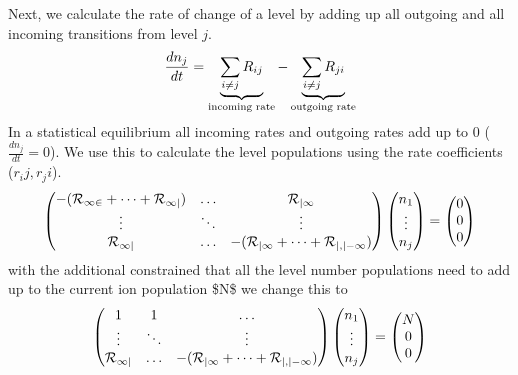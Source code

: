 \documentclass[letterpaper,10pt,english]{sphinxmanual}
\begin{document}
Next, we calculate the rate of change of a level by adding up all outgoing and all incoming transitions from level $j$.
\begin{gather}
\begin{split}\frac{dn_j}{dt} = \underbrace{\sum_{i \ne j} R_{ij}}_\textrm{incoming rate} -
                    \underbrace{\sum_{i \ne j} R_{ji}}_\textrm{outgoing rate}\end{split}\notag
\end{gather}
In a statistical equilibrium all incoming rates and outgoing rates add up to 0 ($\frac{dn_j}{dt}=0$). We use this to
calculate the level populations using the rate coefficients ($r_ij, r_ji$).
\begin{gather}
\begin{split}\left(
\begin{matrix}
-(\cal{R}_{12} + \dots + \cal{R}_{1j}) & \dots & \cal{R}_{j1}\\
\vdots & \ddots & \vdots \\
\cal{R}_{1j} & \dots & - (\cal{R} _{j1} + \dots + \cal{R} _{j, j-1}) \\
\end{matrix}
\right)
%
\left(
\begin{matrix}
n_1\\
\vdots\\
n_j\\
\end{matrix}
\right)
%
=
%
\left(
\begin{matrix}
0\\
0\\
0\\
\end{matrix}
\right)\end{split}\notag
\end{gather}
with the additional constrained that all the level number populations need to add up to the current ion population \$N\$ we change this to
\begin{gather}
\begin{split}\left(
\begin{matrix}
1 & 1 & \dots \\
\vdots & \ddots & \vdots \\
\cal{R}_{1j} & \dots & - (\cal{R} _{j1} + \dots + \cal{R} _{j, j-1}) \\
\end{matrix}
\right)
%
\left(
\begin{matrix}
n_1\\
\vdots\\
n_j\\
\end{matrix}
\right)
%
=
%
\left(
\begin{matrix}
N\\
0\\
0\\
\end{matrix}
\right)\end{split}\notag
\end{gather}
\end{document}
